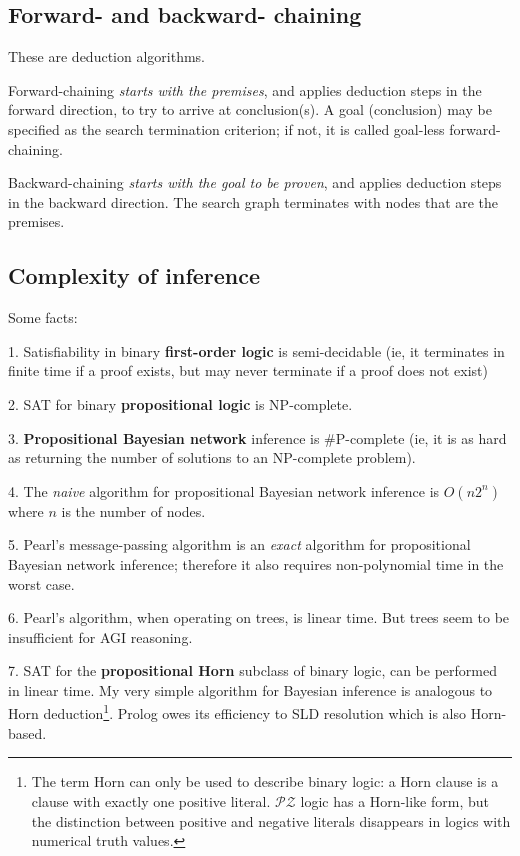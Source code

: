 \subsection{Forward- and backward- chaining}

These are deduction algorithms.

Forward-chaining \textit{starts with the premises}, and applies deduction steps in the forward direction, to try to arrive at conclusion(s).  A goal (conclusion) may be specified as the search termination criterion;  if not, it is called goal-less forward-chaining.

Backward-chaining \textit{starts with the goal to be proven}, and applies deduction steps in the backward direction.  The search graph terminates with nodes that are the premises.

\subsection{Complexity of inference}

Some facts:

1.  Satisfiability in binary \textbf{first-order logic} is semi-decidable (ie, it terminates in finite time if a proof exists, but may never terminate if a proof does not exist)

2.  SAT for binary \textbf{propositional logic} is NP-complete.

3.  \textbf{Propositional Bayesian network} inference is \#P-complete (ie, it is as hard as returning the number of solutions to an NP-complete problem).

4.  The \textit{naive} algorithm for propositional Bayesian network inference is $O(n 2^n)$ where $n$ is the number of nodes.

5.  Pearl's message-passing algorithm is an \textit{exact} algorithm for propositional Bayesian network inference;  therefore it also requires non-polynomial time in the worst case.

6.  Pearl's algorithm, when operating on trees, is linear time.  But trees seem to be insufficient for AGI reasoning.

7.  SAT for the \textbf{propositional Horn} subclass of binary logic, can be performed in linear time.  My very simple algorithm for Bayesian inference is analogous to Horn deduction\footnote{The term Horn can only be used to describe binary logic:  a Horn clause is a clause with exactly one positive literal.  $\mathcal{PZ}$ logic has a Horn-like form, but the distinction between positive and negative literals disappears in logics with numerical truth values.}.  Prolog owes its efficiency to SLD resolution which is also Horn-based.

